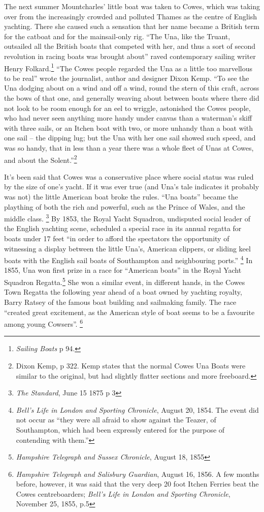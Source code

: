 \documentclass[
  letterpaper,
]{scrbook}
\begin{document}
The next summer Mountcharles' little boat was taken to Cowes, which was
taking over from the increasingly crowded and polluted Thames as the
centre of English yachting. There she caused such a sensation that her
name became a British term for the catboat and for the mainsail-only
rig. ``The Una, like the Truant, outsailed all the British boats that
competed with her, and thus a sort of second revolution in racing boats
was brought about'' raved contemporary sailing writer Henry
Folkard.\footnote{\emph{Sailing Boats} p 94.} ``The Cowes people
regarded the Una as a little too marvellous to be real'' wrote the
journalist, author and designer Dixon Kemp. ``To see the Una dodging
about on a wind and off a wind, round the stern of this craft, across
the bows of that one, and generally weaving about between boats where
there did not look to be room enough for an eel to wriggle, astonished
the Cowes people, who had never seen anything more handy under canvas
than a waterman's skiff with three sails, or an Itchen boat with two, or
more unhandy than a boat with one sail -- the dipping lug; but the Una
with her one sail showed such speed, and was so handy, that in less than
a year there was a whole fleet of Unas at Cowes, and about the
Solent.''\footnote{Dixon Kemp, p 322. Kemp states that the normal Cowes
  Una Boats were similar to the original, but had slightly flatter
  sections and more freeboard.}

It's been said that Cowes was a conservative place where social status
was ruled by the size of one's yacht. If it was ever true (and Una's
tale indicates it probably was not) the little American boat broke the
rules. ``Una boats'' became the plaything of both the rich and powerful,
such as the Prince of Wales, and the middle class. \footnote{\emph{The
  Standard}, June 15 1875 p 3} By 1853, the Royal Yacht Squadron,
undisputed social leader of the English yachting scene, scheduled a
special race in its annual regatta for boats under 17 feet ``in order to
afford the spectators the opportunity of witnessing a display between
the little Una's, American clippers, or sliding keel boats with the
English sail boats of Southampton and neighbouring ports.'' \footnote{\emph{Bell's
  Life in London and Sporting Chronicle}, August 20, 1854. The event did
  not occur as ``they were all afraid to show against the Teazer, of
  Southampton, which had been expressly entered for the purpose of
  contending with them.''} In 1855, Una won first prize in a race for
``American boats'' in the Royal Yacht Squadron Regatta.\footnote{\emph{Hampshire
  Telegraph and Sussex Chronicle}, August 18, 1855} She won a similar
event, in different hands, in the Cowes Town Regatta the following year
ahead of a boat owned by yachting royalty, Barry Ratsey of the famous
boat building and sailmaking family. The race ``created great
excitement, as the American style of boat seems to be a favourite among
young Cowsers''. \footnote{\emph{Hampshire Telegraph and Salisbury
  Guardian}, August 16, 1856. A few months before, however, it was said
  that the very deep 20 foot Itchen Ferries beat the Cowes
  centreboarders; \emph{Bell's Life in London and Sporting Chronicle},
  November 25, 1855, p.5}
\end{document}
